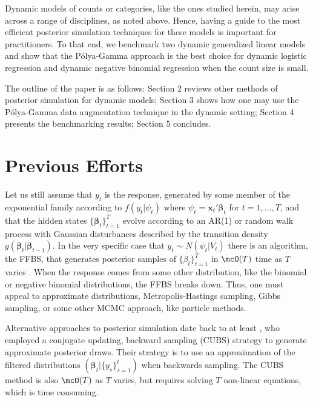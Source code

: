 \documentclass[12pt]{article}
\newcommand{\Polya}{P\'{o}lya}
\newcommand{\bbeta}{\boldsymbol{\beta}}
\newcommand{\vx}{\boldsymbol{x}}
\newcounter{parnum}
\newcommand{\npoint}{%
  \noindent\refstepcounter{parnum}%
  \makebox[0.5in][c]{\textbf{\arabic{parnum}.}} %
  \marginnote{\small\ttfamily\the\inputlineno}}
\renewcommand{\npoint}{}
\begin{document}
\npoint Dynamic models of counts or categories, like the ones studied herein,
may arise across a range of disciplines, as noted above.  Hence, having a guide
to the most efficient posterior simulation techniques for these models is
important for practitioners.  To that end, we benchmark two dynamic generalized
linear models and show that the \Polya-Gamma approach is the best choice for
dynamic logistic regression and dynamic negative binomial regression when the
count size is small.

\npoint The outline of the paper is as follows: Section 2 reviews other methods
of posterior simulation for dynamic models; Section 3 shows how one may use the
\Polya-Gamma data augmentation technique in the dynamic setting; Section 4
presents the benchmarking results; Section 5 concludes.

\section{Previous Efforts}
\label{sec:previous-efforts}

\npoint Let us still assume that $y_t$ is the response, generated by some member
of the exponential family according to $f(y_t | \psi_t)$ where $\psi_t = \vx_t'
\bbeta_t$ for $t=1, \ldots, T$, and that the hidden states
$\{\bbeta_t\}_{t=1}^T$ evolve according to an AR(1) or random walk process with
Gaussian disturbances described by the transition density $g(\bbeta_t |
\bbeta_{t-1})$.
\npoint In the very specific case that $y_t \sim N(\psi_t | V_t)$ there is an
algorithm, the FFBS, that generates posterior samples of $\{\beta_{t}\}_{t=1}^T$
in $\mcO(T)$ time as $T$ varies \citep{carter-kohn-1994,
  fruhwirth-schnatter-1994}.  When the response comes from some other
distribution, like the binomial or negative binomial distributions, the FFBS
breaks down.
\npoint Thus, one must appeal to approximate distributions, Metropolis-Hastings
sampling, Gibbs sampling, or some other MCMC approach, like particle methods.

\npoint Alternative approaches to posterior simulation date back to at least
\cite{west-etal-1985}, who employed a conjugate updating, backward sampling
(CUBS) strategy to generate approximate posterior draws.  Their strategy is to
use an approximation of the filtered distributions $(\bbeta_t |
\{y_s\}_{s=1}^t)$ when backwards sampling.  The CUBS method is also $\mcO(T)$ as
$T$ varies, but requires solving $T$ non-linear equations, which is
time consuming.
\end{document}

